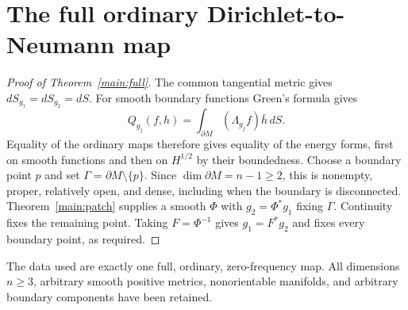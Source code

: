 \section{The full ordinary Dirichlet-to-Neumann map}
\label{sec:full-conclusion}
\begin{proof}[Proof of Theorem~\ref{main:full}]
The common tangential metric gives $dS_{g_1}=dS_{g_2}=dS$.
For smooth boundary functions Green's formula gives
\[
 Q_{g_j}(f,h)=\int_{\partial M}(\Lambda_{g_j}f)\bar h\,dS.
\]
Equality of the ordinary maps therefore gives equality of the energy
forms, first on smooth functions and then on $H^{1/2}$ by their boundedness.
Choose a boundary point $p$ and set $\Gamma=\partial M\setminus\{p\}$.
Since $\dim\partial M=n-1\ge2$, this is nonempty, proper, relatively
open, and dense, including when the boundary is disconnected.
Theorem~\ref{main:patch} supplies a smooth $\Phi$ with
$g_2=\Phi^*g_1$ fixing $\Gamma$. Continuity fixes the remaining point.
Taking $F=\Phi^{-1}$ gives $g_1=F^*g_2$ and fixes every boundary point,
as required.
\end{proof}
The data used are exactly one full, ordinary, zero-frequency map.
All dimensions $n\ge3$, arbitrary smooth positive metrics, nonorientable
manifolds, and arbitrary boundary components have been retained.

